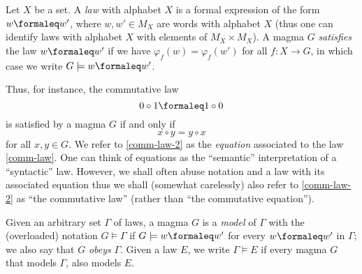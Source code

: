 \begin{definition}[Law]\label{law-def}
  \leanok
  Let $X$ be a set. A \emph{law} with alphabet $X$ is a formal expression of the form $w \formaleq w'$,
  where $w, w' \in M_X$ are words with alphabet $X$ (thus one can identify laws with alphabet $X$
  with elements of $M_X \times M_X$).  A magma $G$ \emph{satisfies} the law $w \formaleq w'$ if
  we have $\varphi_f( w ) = \varphi_f ( w' )$ for all $f: X \to G$, in which case we write
  $G \models w \formaleq w'$.
\end{definition}

Thus, for instance, the commutative law
\begin{equation}\label{comm-law}
  0 \circ 1 \formaleq 1 \circ 0
\end{equation}
is satisfied by a magma $G$ if and only if
\begin{equation}\label{comm-law-2}
 x \circ y = y \circ x
\end{equation}
for all $x, y \in G$.  We refer to \eqref{comm-law-2} as the \emph{equation} associated to the law \eqref{comm-law}.  One can think of equations as the ``semantic'' interpretation of a ``syntactic'' law.  However, we shall often abuse notation and a law with its associated equation thus we shall (somewhat carelessly) also refer to \eqref{comm-law-2} as ``the commutative law'' (rather than ``the commutative equation'').

\begin{definition}[Models]\label{models-def}
  \leanok
  Given an arbitrary set $\Gamma$ of laws, a magma $G$ is a \emph{model} of $\Gamma$ with the
  (overloaded) notation $G\models\Gamma$ if $G\models w\formaleq w'$ for every $w\formaleq w'$ in $\Gamma$; we also say that $G$ \emph{obeys} $\Gamma$.  Given a law $E$, we write $\Gamma \models E$ if every magma $G$ that models $\Gamma$, also models $E$.
\end{definition}

